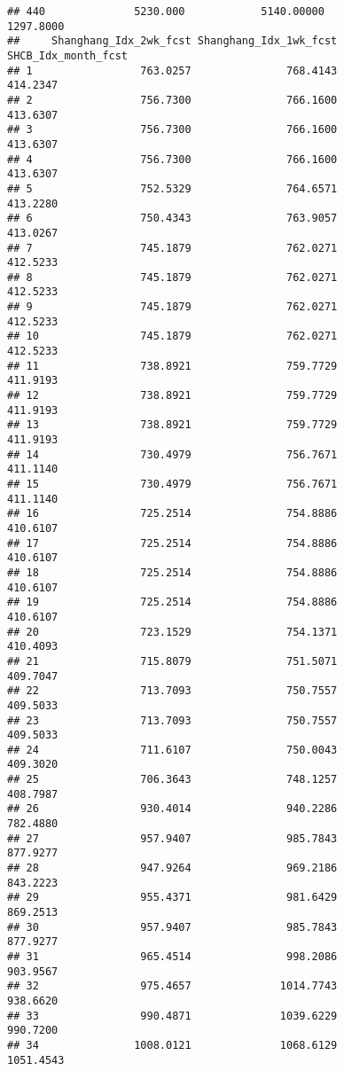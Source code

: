\documentclass[]{article}
\begin{document}
\begin{verbatim}
## 440              5230.000            5140.00000                1297.8000
##     Shanghang_Idx_2wk_fcst Shanghang_Idx_1wk_fcst SHCB_Idx_month_fcst
## 1                 763.0257               768.4143            414.2347
## 2                 756.7300               766.1600            413.6307
## 3                 756.7300               766.1600            413.6307
## 4                 756.7300               766.1600            413.6307
## 5                 752.5329               764.6571            413.2280
## 6                 750.4343               763.9057            413.0267
## 7                 745.1879               762.0271            412.5233
## 8                 745.1879               762.0271            412.5233
## 9                 745.1879               762.0271            412.5233
## 10                745.1879               762.0271            412.5233
## 11                738.8921               759.7729            411.9193
## 12                738.8921               759.7729            411.9193
## 13                738.8921               759.7729            411.9193
## 14                730.4979               756.7671            411.1140
## 15                730.4979               756.7671            411.1140
## 16                725.2514               754.8886            410.6107
## 17                725.2514               754.8886            410.6107
## 18                725.2514               754.8886            410.6107
## 19                725.2514               754.8886            410.6107
## 20                723.1529               754.1371            410.4093
## 21                715.8079               751.5071            409.7047
## 22                713.7093               750.7557            409.5033
## 23                713.7093               750.7557            409.5033
## 24                711.6107               750.0043            409.3020
## 25                706.3643               748.1257            408.7987
## 26                930.4014               940.2286            782.4880
## 27                957.9407               985.7843            877.9277
## 28                947.9264               969.2186            843.2223
## 29                955.4371               981.6429            869.2513
## 30                957.9407               985.7843            877.9277
## 31                965.4514               998.2086            903.9567
## 32                975.4657              1014.7743            938.6620
## 33                990.4871              1039.6229            990.7200
## 34               1008.0121              1068.6129           1051.4543

\end{verbatim}
\end{document}
